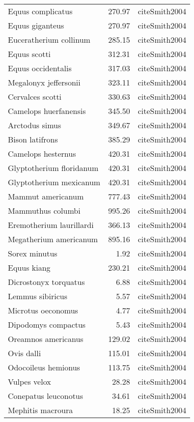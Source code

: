 \begin{table}[ht]
\begin{tabular}{lrl}
  Equus complicatus & 270.97 & cite{Smith2004} \\ 
  Equus giganteus & 270.97 & cite{Smith2004} \\ 
  Euceratherium collinum & 285.15 & cite{Smith2004} \\ 
  Equus scotti & 312.31 & cite{Smith2004} \\ 
  Equus occidentalis & 317.03 & cite{Smith2004} \\ 
  Megalonyx jeffersonii & 323.11 & cite{Smith2004} \\ 
  Cervalces scotti & 330.63 & cite{Smith2004} \\ 
  Camelops huerfanensis & 345.50 & cite{Smith2004} \\ 
  Arctodus simus & 349.67 & cite{Smith2004} \\ 
  Bison latifrons & 385.29 & cite{Smith2004} \\ 
  Camelops hesternus & 420.31 & cite{Smith2004} \\ 
  Glyptotherium floridanum & 420.31 & cite{Smith2004} \\ 
  Glyptotherium mexicanum & 420.31 & cite{Smith2004} \\ 
  Mammut americanum & 777.43 & cite{Smith2004} \\ 
  Mammuthus columbi & 995.26 & cite{Smith2004} \\ 
  Eremotherium laurillardi & 366.13 & cite{Smith2004} \\ 
  Megatherium americanum & 895.16 & cite{Smith2004} \\ 
  Sorex minutus & 1.92 & cite{Smith2004} \\ 
  Equus kiang & 230.21 & cite{Smith2004} \\ 
  Dicrostonyx torquatus & 6.88 & cite{Smith2004} \\ 
  Lemmus sibiricus & 5.57 & cite{Smith2004} \\ 
  Microtus oeconomus & 4.77 & cite{Smith2004} \\ 
  Dipodomys compactus & 5.43 & cite{Smith2004} \\ 
  Oreamnos americanus & 129.02 & cite{Smith2004} \\ 
  Ovis dalli & 115.01 & cite{Smith2004} \\ 
  Odocoileus hemionus & 113.75 & cite{Smith2004} \\ 
  Vulpes velox & 28.28 & cite{Smith2004} \\ 
  Conepatus leuconotus & 34.61 & cite{Smith2004} \\ 
  Mephitis macroura & 18.25 & cite{Smith2004} \\ 

\end{tabular}
\end{table}
